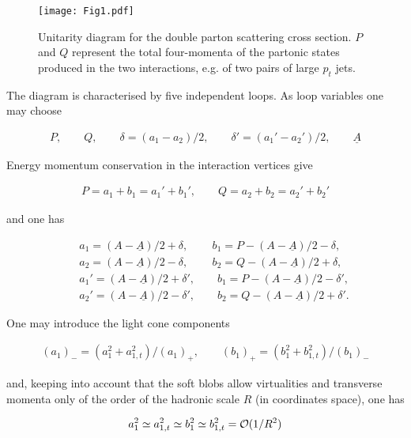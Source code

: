 \documentclass{ws-rv9x6}
\begin{document}
\begin{figure}[htp]
\centering
\texttt{[image: Fig1.pdf]}
\vspace{0cm}
\caption{Unitarity diagram for the double parton scattering cross section. $P$ and $Q$ represent the total four-momenta of the partonic states produced in the two interactions, e.g. of two pairs of large $p_t$ jets.}
\label{fig:double_scattering}
\end{figure}

\noindent The diagram is characterised by five independent loops. As loop variables one may choose

\begin{eqnarray}
P,\qquad Q,\qquad \delta=(a_1-a_2)/2,\qquad \delta'=(a_1'-a_2')/2, \qquad \underline{A}
\end{eqnarray}

\noindent Energy momentum conservation in the interaction vertices give

\begin{eqnarray}
P=a_1+b_1=a_1'+b_1',\qquad Q=a_2+b_2=a_2'+b_2'
\end{eqnarray}

\noindent and one has 

\begin{eqnarray}
&&a_1=(A-\underline{A})/2+\delta, \qquad\, b_1=P-(A-\underline{A})/2-\delta,\nonumber\\
&&a_2=(A-\underline{A})/2-\delta, \qquad\, b_2=Q-(A-\underline{A})/2+\delta,\nonumber\\
&&a_1'=(A-\underline{A})/2+\delta', \qquad b_1=P-(A-\underline{A})/2-\delta',\nonumber\\
&&a_2'=(A-\underline{A})/2-\delta', \qquad b_2=Q-(A-\underline{A})/2+\delta'.
\end{eqnarray}

\noindent One may introduce the light cone components

\begin{eqnarray}
(a_1)_-=(a_1^2+a_{1,t}^2)/(a_1)_+,\qquad  (b_1)_+=(b_1^2+b_{1,t}^2)/(b_1)_-
\end{eqnarray}

\noindent and, keeping into account that the soft blobs allow virtualities and transverse momenta only of the order of the hadronic scale $R$ (in coordinates space), one has 

\begin{eqnarray}
a_1^2\simeq a_{1,t}^2\simeq b_1^2\simeq b_{1,t}^2={\cal O}(1/R^2)
\end{eqnarray}
\end{document}
